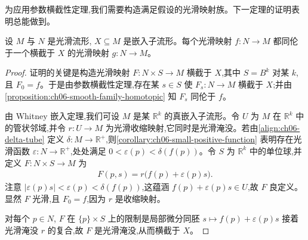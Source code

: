 \documentclass[../../main.tex]{subfiles}
\begin{document}
为应用参数横截性定理,我们需要构造满足假设的光滑映射族。下一定理的证明表明总能做到。

\begin{theorem}\label{theorem:ch06-transversality-homotopy}
设 $M$ 与 $N$ 是光滑流形, $X\subseteq M$ 是嵌入子流形。每个光滑映射 $f:N\to M$ 都同伦于一个横截于 $X$ 的光滑映射 $g:N\to M$。
\end{theorem}

\begin{proof}
证明的关键是构造光滑映射 $F:N\times S\to M$ 横截于 $X$,其中 $S=B^k$ 对某 $k$,且 $F_0=f$。于是由参数横截性定理,存在某 $s\in S$ 使 $F_s:N\to M$ 横截于 $X$;并由\cref{proposition:ch06-smooth-family-homotopic} 知 $F_s$ 同伦于 $f$。

由 Whitney 嵌入定理,我们可设 $M$ 是某 $\mathbb{R}^k$ 的真嵌入子流形。令 $U$ 为 $M$ 在 $\mathbb{R}^k$ 中的管状邻域,并令 $r:U\to M$ 为光滑收缩映射,它同时是光滑淹没。若由\eqref{align:ch06-delta-tube} 定义 $\delta:M\to\mathbb{R}^+$,则\cref{corollary:ch06-small-positive-function} 表明存在光滑函数 $\varepsilon:N\to\mathbb{R}^+$,处处满足 $0<\varepsilon(p)<\delta(f(p))$。令 $S$ 为 $\mathbb{R}^k$ 中的单位球,并定义 $F:N\times S\to M$ 为
\begin{align*}
F(p,s)=r\bigl(f(p)+\varepsilon(p)s\bigr).
\end{align*}
注意 $|\varepsilon(p)s|<\varepsilon(p)<\delta(f(p))$,这蕴涵 $f(p)+\varepsilon(p)s\in U$,故 $F$ 良定义。显然 $F$ 光滑,且 $F_0=f$,因为 $r$ 是收缩映射。

对每个 $p\in N$, $F$ 在 $\{p\}\times S$ 上的限制是局部微分同胚 $s\mapsto f(p)+\varepsilon(p)s$ 接着光滑淹没 $r$ 的复合,故 $F$ 是光滑淹没,从而横截于 $X$。
\end{proof}
\end{document}
